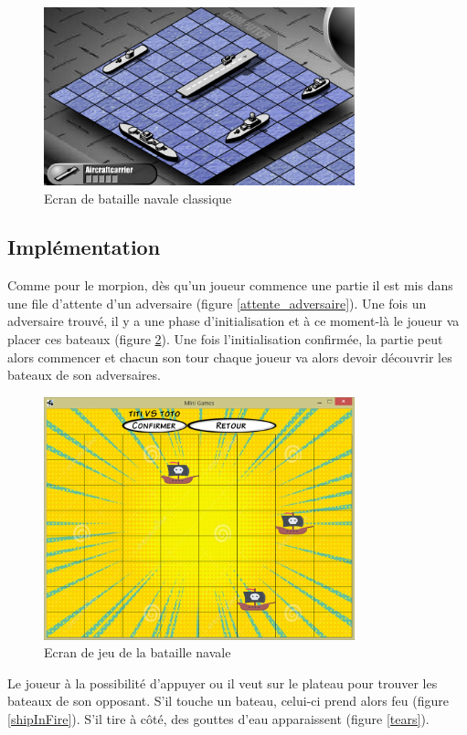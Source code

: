 \documentclass{report}
\begin{document}
\begin{figure}[H]
	\centering\includegraphics[width=9cm]{batailleClassique}
	\caption{Ecran de bataille navale classique}
	\label{batailleClassique}
\end{figure}

\subsection{Implémentation}
Comme pour le morpion, dès qu'un joueur commence une partie il est mis dans une file d'attente d'un adversaire (figure \ref{attente_adversaire}).
Une fois un adversaire trouvé, il y a une phase d'initialisation et à ce moment-là le joueur va placer ces bateaux (figure \ref{notreBataille}). Une fois l'initialisation confirmée,
la partie peut alors commencer et chacun son tour chaque joueur va alors devoir découvrir les bateaux de son adversaires.

\begin{figure}[H]
	\centering\includegraphics[width=9cm]{notreBataille}
	\caption{Ecran de jeu de la bataille navale}
	\label{notreBataille}
\end{figure}
Le joueur à la possibilité d'appuyer ou il veut sur le plateau pour trouver les bateaux de son opposant. S'il touche un bateau, celui-ci prend alors feu (figure \ref{shipInFire}). S'il tire
à côté, des gouttes d'eau apparaissent (figure \ref{tears}).
\end{document}
